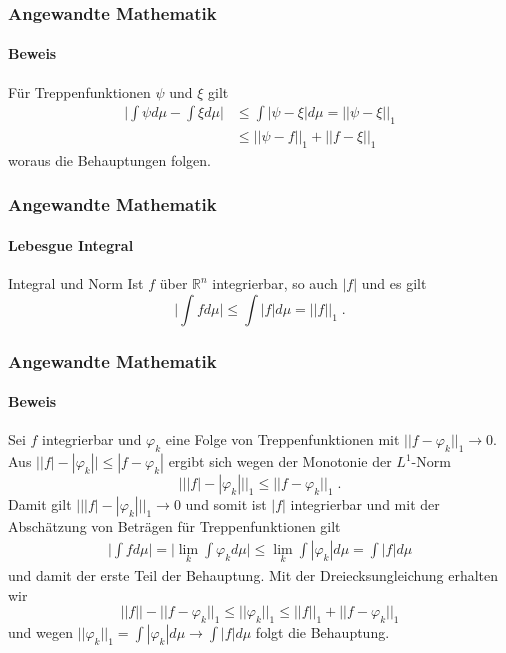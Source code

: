 \documentclass{beamer}
\begin{document}
\begin{frame}
    \frametitle{Angewandte Mathematik}
\framesubtitle{Beweis}
Für Treppenfunktionen $\psi$ und $\xi$ gilt 
\begin{align*}
\biggl | \int \psi d \mu - \int \xi d \mu \biggr |  &  \leq \int | \psi - \xi | d \mu = || \psi - \xi ||_1 \\
& \leq  || \psi - f ||_1 +  || f - \xi ||_1
\end{align*}
woraus die Behauptungen folgen.
 \end{frame}


\begin{frame}
    \frametitle{Angewandte Mathematik}
\framesubtitle{Lebesgue Integral}
    \begin{block}{Integral und Norm}
Ist $f$ über $\mathbb{R}^n$ integrierbar, so auch $|f|$ und es gilt
$$ \biggl | \int f d \mu \biggr | \leq \int  | f | d \mu = || f ||_1 \; .$$
\end{block}

 \end{frame}


\begin{frame}
    \frametitle{Angewandte Mathematik}
\framesubtitle{Beweis}
Sei $f$ integrierbar und $\varphi_k$ eine Folge von Treppenfunktionen mit $|| f - \varphi_k ||_1 \to 0$. 
Aus $\bigl | | f | - | \varphi_k | \bigr | \leq | f -\varphi_k | $ ergibt sich wegen der Monotonie der $L^1$-Norm
$$\bigl |  \bigl |  | f | - | \varphi_k | \bigr | \bigr |_1 \leq \bigl |  \bigl |   f  -  \varphi_k  \bigr | \bigr |_1  \; .$$ 
Damit gilt $\bigl |  \bigl |  | f | - | \varphi_k | \bigr | \bigr |_1 \to 0$ und somit ist $|f|$ integrierbar und mit der Abschätzung von Beträgen für Treppenfunktionen gilt 
\begin{align*}
\biggl | \int f d \mu \biggr | = \biggl | \lim_k \int \varphi_k d \mu \biggr | \leq  \lim_k \int |\varphi_k| d \mu = \int |f| d\mu
\end{align*} 
und damit der erste Teil der Behauptung. 
Mit der Dreiecksungleichung erhalten wir
$$ || f || - ||  f - \varphi_k ||_1 \leq || \varphi_k ||_1  \leq || f ||_1 + || f - \varphi_k ||_1 $$
und wegen $|| \varphi_k ||_1 = \int | \varphi_k | d \mu \to \int | f | d \mu$ folgt die Behauptung.
 \end{frame}
\end{document}
